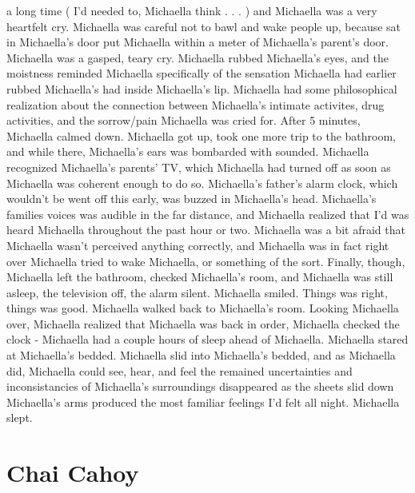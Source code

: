 \documentclass[12pt]{book}
\begin{document}
a long time ( I'd needed to, Michaella think . . .   ) and Michaella was a very heartfelt cry. Michaella was careful not to bawl and wake people up, because sat in Michaella's door put Michaella within a meter of Michaella's parent's door. Michaella was a gasped, teary cry. Michaella rubbed Michaella's eyes, and the moistness reminded Michaella specifically of the sensation Michaella had earlier rubbed Michaella's had inside Michaella's lip. Michaella had some philosophical realization about the connection between Michaella's intimate activites, drug activities, and the sorrow/pain Michaella was cried for. After 5 minutes, Michaella calmed down. Michaella got up, took one more trip to the bathroom, and while there, Michaella's ears was bombarded with sounded. Michaella recognized Michaella's parents' TV, which Michaella had turned off as soon as Michaella was coherent enough to do so. Michaella's father's alarm clock, which wouldn't be went off this early, was buzzed in Michaella's head. Michaella's families voices was audible in the far distance, and Michaella realized that I'd was heard Michaella throughout the past hour or two. Michaella was a bit afraid that Michaella wasn't perceived anything correctly, and Michaella was in fact right over Michaella tried to wake Michaella, or something of the sort. Finally, though, Michaella left the bathroom, checked Michaella's room, and Michaella was still asleep, the television off, the alarm silent. Michaella smiled. Things was right, things was good. Michaella walked back to Michaella's room. Looking Michaella over, Michaella realized that Michaella was back in order, Michaella checked the clock - Michaella had a couple hours of sleep ahead of Michaella. Michaella stared at Michaella's bedded. Michaella slid into Michaella's bedded, and as Michaella did, Michaella could see, hear, and feel the remained uncertainties and inconsistancies of Michaella's surroundings disappeared as the sheets slid down Michaella's arms produced the most familiar feelings I'd felt all night. Michaella slept.



\chapter{Chai Cahoy}
\end{document}
